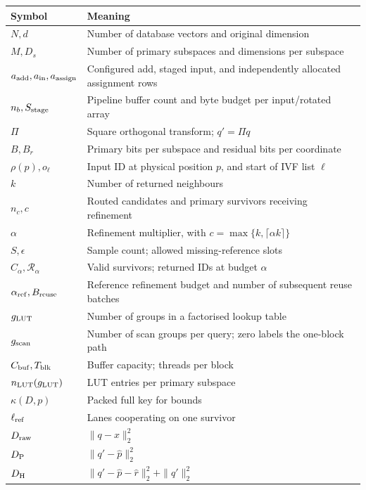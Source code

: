 \begingroup\small{}
\begin{longtable}{@{}>{\raggedright\arraybackslash}p{.25\linewidth}>{\raggedright\arraybackslash}p{.70\linewidth}@{}}
\toprule
Symbol & Meaning \\
\midrule
$N,d$ & Number of database vectors and original dimension \\
$M,D_s$ & Number of primary subspaces and dimensions per subspace \\
$a_{\rm add},a_{\rm in},a_{\rm assign}$ & Configured add, staged input, and independently allocated assignment rows \\
$n_b,S_{\rm stage}$ & Pipeline buffer count and byte budget per input/rotated array \\
$\Pi$ & Square orthogonal transform; $q'=\Pi q$ \\
$B,B_r$ & Primary bits per subspace and residual bits per coordinate \\
$\rho(p),o_\ell$ & Input ID at physical position $p$, and start of IVF list $\ell$ \\
$k$ & Number of returned neighbours \\
$n_c,c$ & Routed candidates and primary survivors receiving refinement \\
$\alpha$ & Refinement multiplier, with $c=\max\{k,\lceil\alpha k\rceil\}$ \\
$S,\epsilon$ & Sample count; allowed missing-reference slots \\
$C_\alpha,\mathcal R_\alpha$ & Valid survivors; returned IDs at budget $\alpha$ \\
$\alpha_{\rm ref},B_{\rm reuse}$ & Reference refinement budget and number of subsequent reuse batches \\
$g_{\mathrm{LUT}}$ & Number of groups in a factorised lookup table \\
$g_{\mathrm{scan}}$ & Number of scan groups per query; zero labels the one-block path \\
$C_{\rm buf},T_{\rm blk}$ & Buffer capacity; threads per block \\
$n_{\rm LUT}(g_{\mathrm{LUT}})$ & LUT entries per primary subspace \\
$\kappa(D,p)$ & Packed full key for bounds \\
$\ell_{\mathrm{ref}}$ & Lanes cooperating on one survivor \\
$D_{\mathrm{raw}}$ & $\|q-x\|_2^2$ \\
$D_{\mathrm{P}}$ & $\|q'-\widehat p\|_2^2$ \\
$D_{\mathrm{H}}$ & $\|q'-\widehat p-\widehat r\|_2^2+\|q'\|_2^2$ \\
\bottomrule
\end{longtable}

